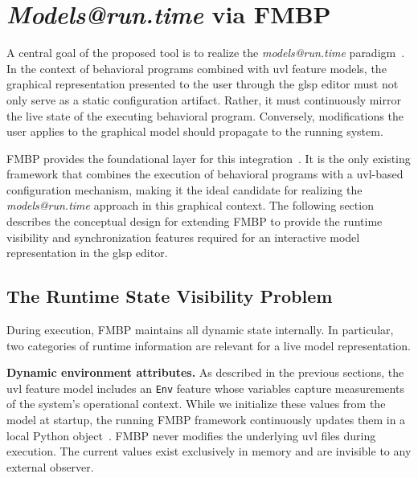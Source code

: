 \section{\textit{Models@run.time} via FMBP}
\label{sec:concept_fmbp}
 
A central goal of the proposed tool is to realize the \textit{models@run.time} paradigm~\cite{blair_models_2009, bencomo_modelsruntime_2019}.
In the context of behavioral programs combined with \gls{uvl} feature models, the graphical representation presented to the user through the \gls{glsp} editor must not only serve as a static configuration artifact.
Rather, it must continuously mirror the live state of the executing behavioral program.
Conversely, modifications the user applies to the graphical model should propagate to the running system.
 
FMBP provides the foundational layer for this integration~\cite{felber_comprehensible_2025}.
It is the only existing framework that combines the execution of behavioral programs with a \gls{uvl}-based configuration mechanism, making it the ideal candidate for realizing the \textit{models@run.time} approach in this graphical context.
The following section describes the conceptual design for extending FMBP to provide the runtime visibility and synchronization features required for an interactive model representation in the \gls{glsp} editor.

\subsection{The Runtime State Visibility Problem}
\label{subsec:concept_fmbp_runtime_visibility}
 
During execution, FMBP maintains all dynamic state internally.
In particular, two categories of runtime information are relevant for a live model representation.

\textbf{Dynamic environment attributes.}
As described in the previous sections, the \gls{uvl} feature model includes an \texttt{Env} feature whose variables capture measurements of the system's operational context.
While we initialize these values from the model at startup, the running FMBP framework continuously updates them in a local Python object~\cite{felber_tfelbrfmbp_2025}.
FMBP never modifies the underlying \gls{uvl} files during execution.
The current values exist exclusively in memory and are invisible to any external observer.


